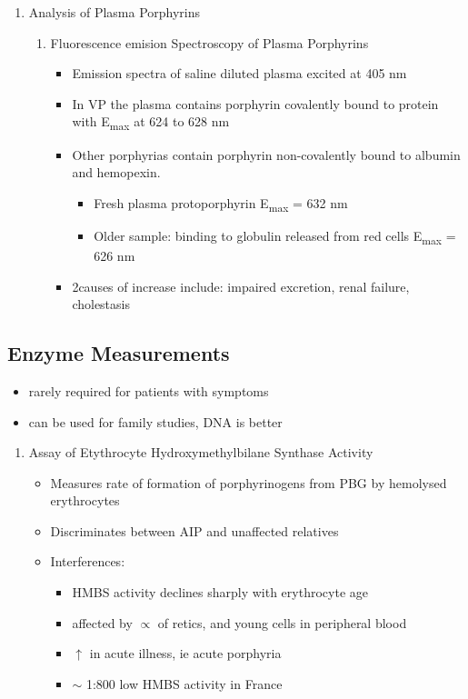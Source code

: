 \documentclass{scrartcl}
\begin{document}
\begin{enumerate}
\item Analysis of Plasma Porphyrins
\label{sec:org5329dc3}
\begin{enumerate}
\item Fluorescence emision Spectroscopy of Plasma Porphyrins
\label{sec:org5e3940a}
\begin{itemize}
\item Emission spectra of saline diluted plasma excited at 405 nm
\item In VP the plasma contains porphyrin covalently bound to protein with
E\textsubscript{max} at 624 to 628 nm
\item Other porphyrias contain porphyrin non-covalently bound to albumin
and hemopexin.
\begin{itemize}
\item Fresh plasma protoporphyrin E\textsubscript{max} = 632 nm
\item Older sample: binding to globulin released from red cells E\textsubscript{max} =
626 nm
\end{itemize}
\item 2\degree causes of increase include: impaired excretion, renal
failure, cholestasis
\end{itemize}
\end{enumerate}
\end{enumerate}

\subsection{Enzyme Measurements}
\label{sec:org5ebe72e}
\begin{itemize}
\item rarely required for patients with symptoms
\item can be used for family studies, DNA is better
\end{itemize}
\begin{enumerate}
\item Assay of Etythrocyte Hydroxymethylbilane Synthase Activity
\label{sec:org4c277be}
\begin{itemize}
\item Measures rate of formation of porphyrinogens from PBG by hemolysed erythrocytes
\item Discriminates between AIP and unaffected relatives
\item Interferences:
\begin{itemize}
\item HMBS activity declines sharply with erythrocyte age
\item affected by \(\propto\) of retics, and young cells in peripheral blood
\item \(\uparrow\) in acute illness, ie acute porphyria
\item \(\sim\) 1:800 low HMBS activity in France
\end{itemize}
\end{itemize}
\end{enumerate}
\end{document}
